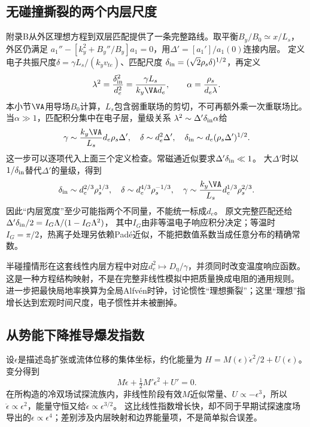 \subsection{无碰撞撕裂的两个内层尺度}
\citet{E512}附录B从外区理想方程到双层匹配提供了一条完整路线。取平衡$B_y/B_0\simeq x/L_s$，外区仍满足
$a_1''-[k_y^2+B_y''/B_y]a_1=0$，用$\Delta'=[a_1']/a_1(0)$连接内层。
定义电子共振尺度$\delta=\gamma L_s/(k_yv_{te})$、匹配尺度
$\delta_{\rm in}=(\sqrt2\rho_s\delta)^{1/2}$，再定义
\begin{equation}
 \lambda^2={\delta_{\rm in}^2\over d_e^2}={\gamma L_s\over k_y\VA d_e},\qquad
 \alpha={\rho_s\over d_e\lambda}.
\end{equation}
本小节$\VA$用导场$B_0$计算，$L_s$包含弱重联场的剪切，不可再额外乘一次重联场比。
当$\alpha\gg1$，匹配积分集中在电子层，量级关系
$\lambda^2\sim\Delta'\delta_{\rm in}\alpha$给
\begin{equation}
 \gamma\sim{k_y\VA\over L_s}d_e\rho_s\Delta',\quad
 \delta\sim d_e^2\Delta',\quad
 \delta_{\rm in}\sim d_e(\rho_s\Delta')^{1/2}.
\end{equation}
这一步可以逐项代入上面三个定义检查。常磁通近似要求$\Delta'\delta_{\rm in}\ll1$。
大$\Delta'$时以$1/\delta_{\rm in}$替代$\Delta'$的量级，得到
\begin{equation}
 \delta_{\rm in}\sim d_e^{2/3}\rho_s^{1/3},\quad
 \delta\sim d_e^{4/3}\rho_s^{-1/3},\quad
 \gamma\sim{k_y\VA\over L_s}d_e^{1/3}\rho_s^{2/3}.
\end{equation}
因此“内层宽度”至少可能指两个不同量，不能统一标成$d_e$。
原文完整匹配还给$\Delta'\delta_{\rm in}/2=I_G\Lambda/(1-I_G\Lambda^2)$，
其中$I_G$由非等温电子响应积分决定；等温时$I_G=\pi/2$，热离子处理另依赖Padé近似，不能把数值系数当成任意分布的精确常数。

半碰撞情形在这套线性内层方程中对应$d_e^2\mapsto D_\eta/\gamma$，并须同时改变温度响应函数。
这是一种方程结构映射，不是在完整非线性模拟中把质量换成电阻的通用规则。
\citet{L210}进一步把最快局地率换算为全局Alfvén时钟，讨论惯性“理想撕裂”；这里“理想”指增长达到宏观时间尺度，电子惯性并未被删掉。

\subsection{从势能下降推导爆发指数}
设$\epsilon$是描述岛扩张或流体位移的集体坐标，约化能量为
$H=M(\epsilon)\dot\epsilon^2/2+U(\epsilon)$。
变分得到
\begin{equation}
 M\ddot\epsilon+\tfrac12M'\dot\epsilon^2+U'=0.
\end{equation}
\citet{L191}在所构造的冷双场试探流族内，非线性阶段有效$M$近似常量、$U\propto-\epsilon^3$，所以
$\ddot\epsilon\propto\epsilon^2$，能量守恒又给$\dot\epsilon\propto\epsilon^{3/2}$。
这比线性指数增长快，却不同于早期试探速度场导出的$\ddot\epsilon\propto\epsilon^4$；差别涉及内层映射和边界能量项，不是简单拟合误差。

